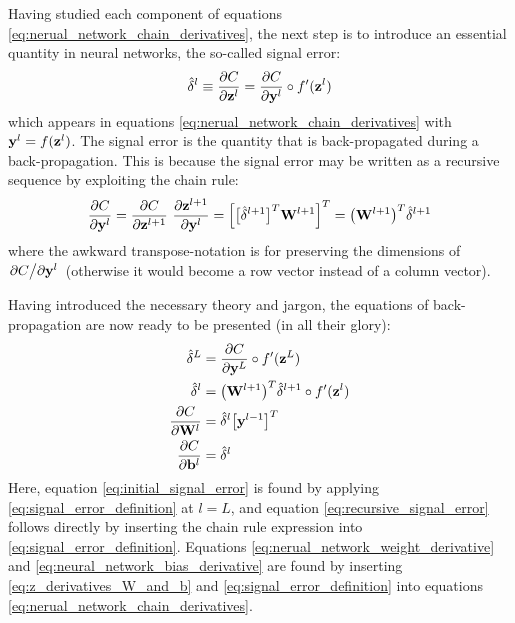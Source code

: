 \documentclass[nofootinbib,reprint,english]{revtex4-1}
\newcommand{\W}{\vb{W}}
\newcommand{\deltahat}{\hat{\delta}}
\begin{document}
Having studied each component of equations \eqref{eq:nerual_network_chain_derivatives}, the next step is to introduce an essential quantity in neural networks, the so-called signal error:
\begin{equation}\label{eq:signal_error_definition}
\deltahat^l\equiv\pdv{C}{\vb{z}^l}=\pdv{C}{\vb{y}^l}\circ f'(\vb{z}^l)
\end{equation}
which appears in equations \eqref{eq:nerual_network_chain_derivatives} with \(\vb{y}^l=f(\vb{z}^l)\). The signal error is the quantity that is back-propagated during a back-propagation. This is because the signal error may be written as a recursive sequence by exploiting the chain rule:
\[\pdv{C}{\vb{y}^l}=\pdv{C}{\vb{z}^{l+1}}\ \pdv{\vb{z}^{l+1}}{\vb{y}^l}=\Big[\big[\deltahat^{l+1}\big]^T\W^{l+1}\Big]^T=\big(\W^{l+1}\big)^T\deltahat^{l+1}\]
where the awkward transpose-notation is for preserving the dimensions of \(\pdv*{C}{\vb{y}^l}\) (otherwise it would become a row vector instead of a column vector).

Having introduced the necessary theory and jargon, the equations of back-propagation are now ready to be presented (in all their glory):
\begin{subequations}\label{eq:back_propagation_equations}
\begin{align}
\deltahat^L&=\pdv{C}{\vb{y}^L}\circ f'(\vb{z}^L)\label{eq:initial_signal_error}\\
\deltahat^l&=\big(\W^{l+1}\big)^T\deltahat^{l+1}\circ f'(\vb{z}^l)\label{eq:recursive_signal_error}\\
\pdv{C}{\W^l}&=\deltahat^l\big[\vb{y}^{l-1}\big]^T\label{eq:nerual_network_weight_derivative}\\
\pdv{C}{\vb{b}^l}&=\deltahat^l\label{eq:neural_network_bias_derivative}
\end{align}
\end{subequations}
Here, equation \eqref{eq:initial_signal_error} is found by applying \eqref{eq:signal_error_definition} at \(l=L\), and equation \eqref{eq:recursive_signal_error} follows directly by inserting the chain rule expression into \eqref{eq:signal_error_definition}. Equations \eqref{eq:nerual_network_weight_derivative} and \eqref{eq:neural_network_bias_derivative} are found by inserting \eqref{eq:z_derivatives_W_and_b} and \eqref{eq:signal_error_definition} into equations \eqref{eq:nerual_network_chain_derivatives}.
\end{document}
